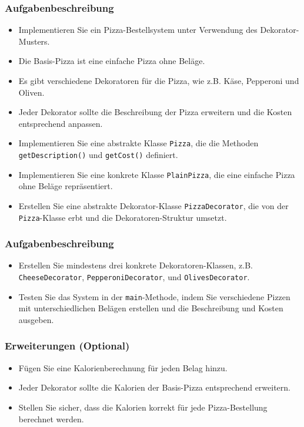 
\begin{frame}
    \frametitle{Aufgabenbeschreibung}
    \begin{itemize}
        \item Implementieren Sie ein Pizza-Bestellsystem unter Verwendung des Dekorator-Musters.
        \item Die Basis-Pizza ist eine einfache Pizza ohne Beläge.
        \item Es gibt verschiedene Dekoratoren für die Pizza, wie z.B. Käse, Pepperoni und Oliven.
        \item Jeder Dekorator sollte die Beschreibung der Pizza erweitern und die Kosten entsprechend anpassen.
        \item Implementieren Sie eine abstrakte Klasse \texttt{Pizza}, die die Methoden \texttt{getDescription()} und \texttt{getCost()} definiert.
        \item Implementieren Sie eine konkrete Klasse \texttt{PlainPizza}, die eine einfache Pizza ohne Beläge repräsentiert.
        \item Erstellen Sie eine abstrakte Dekorator-Klasse \texttt{PizzaDecorator}, die von der \texttt{Pizza}-Klasse erbt und die Dekoratoren-Struktur umsetzt.
    \end{itemize}
\end{frame}

\begin{frame}
    \frametitle{Aufgabenbeschreibung}
    \begin{itemize}
        \item Erstellen Sie mindestens drei konkrete Dekoratoren-Klassen, z.B. \texttt{CheeseDecorator}, \texttt{PepperoniDecorator}, und \texttt{OlivesDecorator}.
        \item Testen Sie das System in der \texttt{main}-Methode, indem Sie verschiedene Pizzen mit unterschiedlichen Belägen erstellen und die Beschreibung und Kosten ausgeben.
    \end{itemize}
\end{frame}

\begin{frame}
    \frametitle{Erweiterungen (Optional)}
    \begin{itemize}
        \item Fügen Sie eine Kalorienberechnung für jeden Belag hinzu.
        \item Jeder Dekorator sollte die Kalorien der Basis-Pizza entsprechend erweitern.
        \item Stellen Sie sicher, dass die Kalorien korrekt für jede Pizza-Bestellung berechnet werden.
    \end{itemize}
\end{frame}
